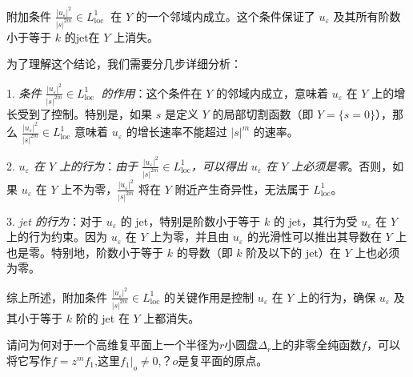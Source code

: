 \documentclass[lang=cn,12pt,fontset=none,a4paper]{beautybook}
\begin{document}
附加条件 $\frac{\left|u_{\varepsilon}\right|^2}{ |s|^{2m}} \in L_{\text {loc }}^1$ 在 $Y$ 的一个邻域内成立。这个条件保证了 $u_{\varepsilon}$ 及其所有阶数小于等于 $k$ 的jet在 $Y$ 上消失。

为了理解这个结论，我们需要分几步详细分析：


1.  \textit{条件 $\frac{\left|u_{\varepsilon}\right|^2}{ |s|^{2m}} \in L_{\text {loc }}^1$ 的作用}：这个条件在 $Y$ 的邻域内成立，意味着 $u_{\varepsilon}$ 在 $Y$ 上的增长受到了控制。特别是，如果 $s$ 是定义 $Y$ 的局部切割函数（即 $Y = \{s = 0\}$），那么 $\frac{\left|u_{\varepsilon}\right|^2}{ |s|^{2m}} \in L_{\text{loc}}^1$ 意味着 $u_{\varepsilon}$ 的增长速率不能超过 $|s|^m$ 的速率。

2.  \textit{$u_{\varepsilon}$ 在 $Y$ 上的行为}：\textit{由于 $\frac{\left|u_{\varepsilon}\right|^2}{ |s|^{2m}} \in L_{\text{loc}}^1$，可以得出 $u_{\varepsilon}$ 在 $Y$ 上必须是零}。否则，如果 $u_{\varepsilon}$ 在 $Y$ 上不为零，$\frac{\left|u_{\varepsilon}\right|^2}{ |s|^{2m}}$ 将在 $Y$ 附近产生奇异性，无法属于 $L_{\text{loc}}^1$。

3.  \textit{jet 的行为}：对于 $u_{\varepsilon}$ 的 jet，特别是阶数小于等于 $k$ 的 jet，其行为受 $u_{\varepsilon}$ 在 $Y$ 上的行为约束。因为 $u_{\varepsilon}$ 在 $Y$ 上为零，并且由 $u_{\varepsilon}$ 的光滑性可以推出其导数在 $Y$ 上也是零。特别地，阶数小于等于 $k$ 的导数（即 $k$ 阶及以下的 jet）在 $Y$ 上也必须为零。

综上所述，附加条件 $\frac{\left|u_{\varepsilon}\right|^2}{ |s|^{2m}} \in L_{\text{loc}}^1$ 的关键作用是控制 $u_{\varepsilon}$ 在 $Y$ 上的行为，确保 $u_{\varepsilon}$ 及其小于等于 $k$ 阶的 jet 在 $Y$ 上都消失。


\begin{problem}[][非零全纯函数的泰勒展开性质]
   请问为何对于一个高维复平面上一个半径为$r$小圆盘$\Delta_r$上的非零全纯函数$f$，可以将它写作$f=z^m f_1$,这里$f_1|_o\neq 0$,？$o$是复平面的原点。
\end{problem}
\end{document}
